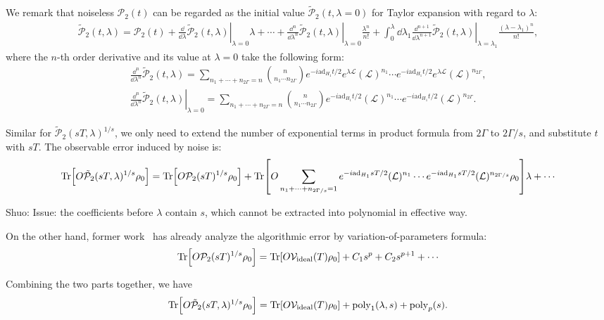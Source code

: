 \documentclass[11pt]{article}
\renewcommand{\L}{\mathcal{L}}
\newcommand{\ad}{\mathrm{ad}}
\renewcommand{\P}{\mathcal{P}}
\newcommand{\sz}[1]{{\color{blue} Shuo: #1}}
\begin{document}
We remark that noiseless $\P_2(t)$ can be regarded as the initial value $\tilde{\P}_2(t,\lambda=0)$ for Taylor expansion with regard to $\lambda$:
\begin{align*}
    \tilde{\P}_2(t,\lambda) = \P_2(t) + \left.\frac{\dd}{\dd\lambda}\tilde{\P}_2(t,\lambda)\right|_{\lambda=0}\lambda+\cdots+\left.\frac{\dd^n}{\dd\lambda^n}\tilde{\P}_2(t,\lambda)\right|_{\lambda=0}\frac{\lambda^n}{n!} + \int_0^\lambda \dd\lambda_1 \left.\frac{\dd^{n+1}}{\dd\lambda^{n+1}}\tilde{\P}_2(t,\lambda)\right|_{\lambda=\lambda_1}\frac{(\lambda-\lambda_1)^n}{n!},
\end{align*}
where the $n$-th order derivative and its value at $\lambda=0$ take the following form:
\begin{align*}
    \frac{\dd^n}{\dd\lambda^n}\tilde{\P}_2(t,\lambda) = \sum_{n_1+\cdots +n_{2\Gamma}=n}\binom{n}{n_1 \cdots n_{2\Gamma}}e^{-i\ad_{H_1}t/2}e^{\lambda\L}(\L)^{n_1}\cdots e^{-i\ad_{H_1}t/2}e^{\lambda\L}(\L)^{n_{2\Gamma}},\\
    \left.\frac{\dd^n}{\dd\lambda^n}\tilde{\P}_2(t,\lambda)\right|_{\lambda=0} = \sum_{n_1+\cdots +n_{2\Gamma}=n}\binom{n}{n_1 \cdots n_{2\Gamma}}e^{-i\ad_{H_1}t/2}(\L)^{n_1}\cdots e^{-i\ad_{H_1}t/2}(\L)^{n_{2\Gamma}}.
\end{align*}

Similar for $\tilde{\P}_2(sT,\lambda)^{1/s}$, we only need to extend the number of exponential terms in product formula from $2\Gamma$ to $2\Gamma/s$, and substitute $t$ with $sT$. The observable error induced by noise is:
\begin{align*}
    \Tr[O\tilde{\P}_2(sT,\lambda)^{1/s}\rho_0] = \Tr[O\P_2(sT)^{1/s}\rho_0] + \Tr[O\sum_{n_1+\cdots +n_{2\Gamma/s}=1}e^{-i\ad_{H_1}sT/2}(\L)^{n_1}\cdots e^{-i\ad_{H_1}sT/2}(\L)^{n_{2\Gamma/s}} \rho_0]\lambda + \cdots 
\end{align*}

\sz{Issue: the coefficients before $\lambda$ contain $s$, which cannot be extracted into polynomial in effective way.}

On the other hand, former work~\cite{watson2024exponentially} has already analyze the algorithmic error by variation-of-parameters formula:
\begin{align*}
    \Tr[O\P_2(sT)^{1/s}\rho_0] = \Tr[O\mathcal{V}_{\text{ideal}}(T)\rho_0] + C_1 s^p + C_2s^{p+1} + \cdots 
\end{align*}

Combining the two parts together, we have
\begin{align*}
    \Tr[O\tilde{\P}_2(sT,\lambda)^{1/s}\rho_0] = \Tr[O\mathcal{V}_{\text{ideal}}(T)\rho_0] + \operatorname{poly}_1(\lambda, s) +\operatorname{poly}_p(s).
\end{align*}
\end{document}
